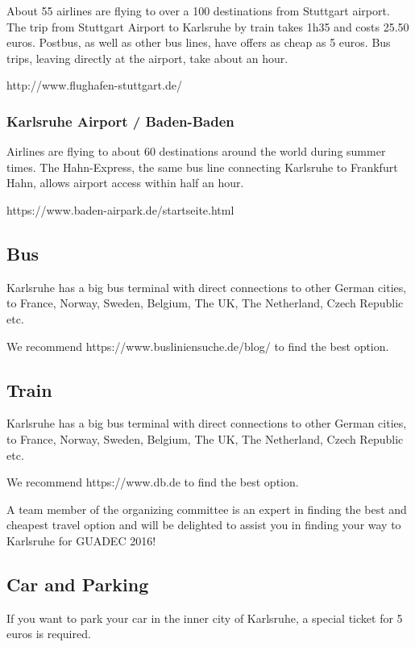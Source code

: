 About 55 airlines are flying to over a 100 destinations from Stuttgart airport. The trip from Stuttgart Airport to Karlsruhe by train takes 1h35 and costs 25.50 euros. Postbus, as well as other bus lines, have offers as cheap as 5 euros. Bus trips, leaving directly at the airport, take about an hour. 

http://www.flughafen-stuttgart.de/

\subsubsection{Karlsruhe Airport / Baden-Baden}

Airlines are flying to about 60 destinations around the world during summer times. The Hahn-Express, the same bus line connecting Karlsruhe to Frankfurt Hahn, allows airport access within half an hour.
 
https://www.baden-airpark.de/startseite.html

\subsection{Bus}

Karlsruhe has a big bus terminal with direct connections to other German cities, to France, Norway, Sweden, Belgium, The UK, The Netherland, Czech Republic etc.

We recommend https://www.busliniensuche.de/blog/ to find the best option.

\subsection{Train}

Karlsruhe has a big bus terminal with direct connections to other German cities, to France, Norway, Sweden, Belgium, The UK, The Netherland, Czech Republic etc.

We recommend https://www.db.de to find the best option.

A team member of the organizing committee is an expert in finding the best and cheapest travel option and will be delighted to assist you in finding your way to Karlsruhe for GUADEC 2016!

\subsection{Car and Parking}

If you want to park your car in the inner city of Karlsruhe, a special ticket for 5 euros is required. 

